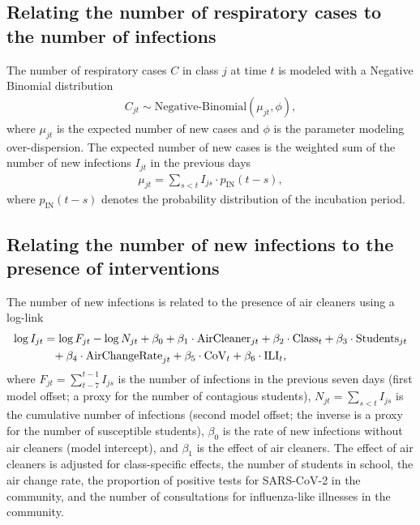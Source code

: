 \documentclass[fleqn,11pt]{wlscirep_supp}
\begin{document}
\subsection{Relating the number of respiratory cases to the number of infections}

The number of respiratory cases $C$ in class $j$ at time $t$ is modeled with a Negative Binomial distribution   
\begin{align*}
    C_{jt} \sim \text{Negative-Binomial}(\mu_{jt},\phi),
\end{align*}
where $\mu_{jt}$ is the expected number of new cases and $\phi$ is the parameter modeling over-dispersion. The expected number of new cases is the weighted sum of the number of new infections $I_{jt}$ in the  previous days
\begin{align*}
    \mu_{jt} = \sum_{s<t}I_{js} \cdot p_{\text{IN}}(t-s),
\end{align*}
where $p_{\text{IN}}(t-s)$ denotes the probability distribution of the incubation period. 

\subsection{Relating the number of new infections to the presence of interventions}

The  number of new infections is related to the presence of air cleaners using a log-link
\begin{align*}
    \log I_{jt} &= \log F_{jt} - \log N_{jt} + \beta_0 + \beta_1 \cdot \text{AirCleaner}_{jt} + \beta_2 \cdot \text{Class}_t + \beta_3 \cdot \text{Students}_{jt} \\
    &\hphantom{= }+ \beta_4 \cdot \text{AirChangeRate}_{jt} + \beta_5 \cdot \text{CoV}_t + \beta_6 \cdot \text{ILI}_t,
\end{align*}
where $F_{jt} = \sum_{t-7}^{t-1} I_{js}$ is the number of infections in the previous seven days (first model offset; a proxy for the number of contagious students), $N_{jt} = \sum_{s<t} I_{js}$ is the cumulative number of infections (second model offset; the inverse is a proxy for the number of susceptible students), $\beta_0$ is the rate of new infections without air cleaners (model intercept), and $\beta_1$ is the effect of air cleaners. The effect of air cleaners is adjusted for class-specific effects, the number of students in school, the air change rate, the proportion of positive tests for SARS-CoV-2 in the community, and the number of consultations for influenza-like illnesses in the community. 
\end{document}
